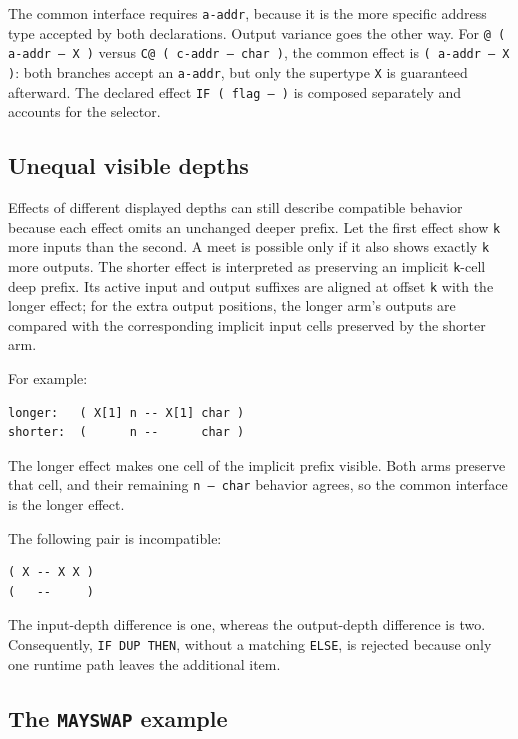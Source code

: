 \documentclass[11pt,a4paper]{article}
\newcommand{\stackeffect}[1]{\mbox{\texttt{#1}}}
\begin{document}
The common interface requires \texttt{a-addr}, because it is the more specific
address type accepted by both declarations.  Output variance goes the other
way.  For \texttt{@ ( a-addr -- X )} versus
\texttt{C@ ( c-addr -- char )}, the common effect is
\texttt{( a-addr -- X )}: both branches accept an \texttt{a-addr}, but only
the supertype \texttt{X} is guaranteed afterward.  The declared effect
\stackeffect{IF ( flag -- )} is composed separately and accounts for the selector.

\subsection{Unequal visible depths}

Effects of different displayed depths can still describe compatible behavior
because each effect omits an unchanged deeper prefix.  Let the first effect
show \texttt{k} more inputs than the second.  A meet is possible only if it
also shows exactly \texttt{k} more outputs.  The shorter effect is interpreted
as preserving an implicit \texttt{k}-cell deep prefix.  Its active input and
output suffixes are aligned at offset \texttt{k} with the longer effect; for
the extra output positions, the longer arm's outputs are compared with the
corresponding implicit input cells preserved by the shorter arm.

For example:

\begin{lstlisting}
longer:   ( X[1] n -- X[1] char )
shorter:  (      n --      char )
\end{lstlisting}

The longer effect makes one cell of the implicit prefix visible.  Both arms
preserve that cell, and their remaining \stackeffect{n -- char} behavior
agrees, so the common interface is the longer effect.

The following pair is incompatible:

\begin{lstlisting}
( X -- X X )
(   --     )
\end{lstlisting}

The input-depth difference is one, whereas the output-depth difference is two.
Consequently, \texttt{IF DUP THEN}, without a matching \texttt{ELSE}, is
rejected because only one runtime path leaves the additional item.

\subsection{The \texttt{MAYSWAP} example}
\end{document}
